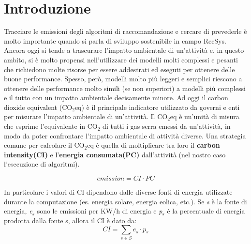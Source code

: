 \section{Introduzione}
Tracciare le emissioni degli algoritmi di raccomandazione e cercare di prevederle è molto importante quando si parla di sviluppo sostenibile in campo RecSys. Ancora oggi si tende a trascurare l'impatto ambientale di un'attività e, in questo ambito, si è molto propensi nell'utilizzare dei modelli molti complessi e pesanti
che richiedono molte risorse per essere addestrati ed eseguti per ottenere delle buone performance. Spesso, però, modelli molto più leggeri e semplici riescono a ottenere delle performance molto simili (se non superiori) a modelli più complessi e il tutto con un impatto ambientale decisamente minore.
Ad oggi il carbon dioxide equivalent (CO$_2$eq) è il principale indicatore utilizzato da governi e enti per misurare l'impatto ambientale di un'attività.
Il CO$_2$eq è un'unità di misura che esprime l'equivalente in CO$_2$ di tutti i gas serra emessi da un'attività, in modo da poter confrontare l'impatto ambientale di attività diverse.
Una strategia comune per calcolare il CO$_2$eq è quella di moltiplicare tra loro il \textbf{carbon intensity(CI)} e l'\textbf{energia consumata(PC)} dall'attività (nel nostro caso l'esecuzione di algoritmi).



\begin{equation*}
    \textit{emission} = \textit{CI}  \cdot \textit{PC}
\end{equation*}

\noindent In particolare i valori di CI dipendono dalle diverse fonti di energia utilizzate durante la computazione 
(es. energia solare, energia eolica, etc.). Se \textit{s} è la fonte di energia,  \textit{e$_s$} sono le emissioni per KW/h di energia e \textit{p$_s$}  è la percentuale di energia prodotta dalla fonte s, allora il CI è dato da:
\begin{equation*}
    \textit{CI} = \sum_{s \in S} \textit{e$_s$} \cdot \textit{p$_s$}
\end{equation*}


